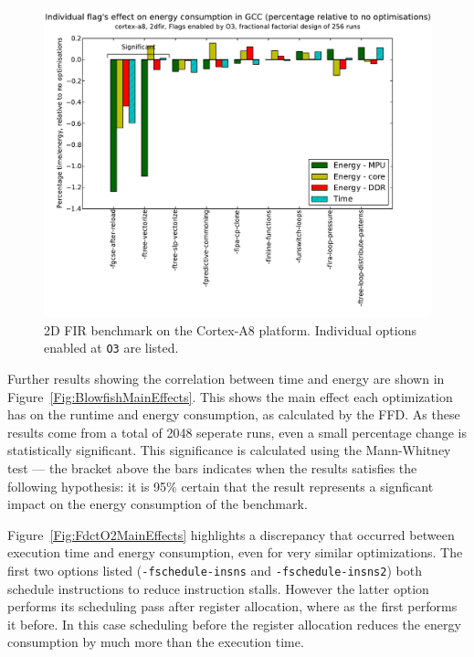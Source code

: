 \documentclass[twocolumn]{article}
\let\oldcaption\caption
\renewcommand{\caption}[1]{\oldcaption{\textup{#1}}}
\begin{document}
\begin{figure}[t]
	\includegraphics[width=\linewidth,clip,trim=0.5cm 0 2cm 1.8cm]{cortex-a8/O3_main_effects_2dfir.pdf}
	\caption{2D FIR benchmark on the Cortex-A8 platform. Individual options enabled at \texttt{O3} are listed.}
	\label{Fig:O3_2dfir_A8}
\end{figure}

Further results showing the correlation between time and energy are shown in Figure~\ref{Fig:BlowfishMainEffects}. This shows the main effect each optimization has on the runtime and energy consumption, as calculated by the FFD. As these results come from a total of 2048 seperate runs, even a small percentage change is statistically significant. This significance is calculated using the Mann-Whitney test --- the bracket above the bars indicates when the results satisfies the following hypothesis: it is 95\% certain that the result represents a signficant impact on the energy consumption of the benchmark.

Figure~\ref{Fig:FdctO2MainEffects} highlights a discrepancy that occurred between execution time and energy consumption, even for very similar optimizations. The first two options listed (\texttt{-fschedule-insns} and \texttt{-fschedule-insns2}) both schedule instructions to reduce instruction stalls. However the latter option performs its scheduling pass after register allocation, where as the first performs it before. In this case scheduling before the register allocation reduces the energy consumption by much more than the execution time.
\end{document}
